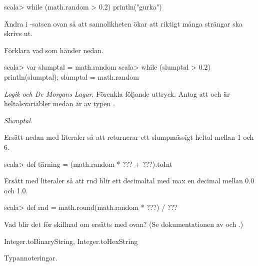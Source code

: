 {{{{\begin{REPL}
scala> while (math.random > 0.2) println("gurka")
\end{REPL}

\Subtask Ändra i -satsen ovan så att sannolikheten ökar att riktigt många  strängar ska skrivs ut.

\Subtask Förklara vad som händer nedan.
\begin{REPL}
scala> var slumptal = math.random
scala> while (slumptal > 0.2) { println(slumptal); slumptal = math.random }
\end{REPL}

\Task\Pen \textit{Logik och De Morgans Lagar}. Förenkla följande uttryck. Antag att  och  är heltalsvariabler medan  är av typen . 

\Subtask {}

\Subtask {}

\Subtask {}

\Subtask {}

\Subtask {}

\Subtask {}

\Subtask {}


\ExtraTasks

\Task \textit{Slumptal}.

\Subtask Ersätt  nedan med literaler så att  returnerar ett slumpmässigt heltal mellan 1 och 6.
\begin{REPL}
scala> def tärning = (math.random * ??? + ???).toInt 
\end{REPL}

\Subtask Ersätt  med literaler så att rnd blir ett decimaltal med max en decimal mellan 0.0 och 1.0.
\begin{REPL}
scala> def rnd = math.round(math.random * ???) / ??? 
\end{REPL}

\Subtask Vad blir det för skillnad om  ersätts med  ovan? (Se dokumentationen av  och .)

\AdvancedTasks

\Task Integer.toBinaryString, Integer.toHexString

\Task Typannoteringar.

}}}}
